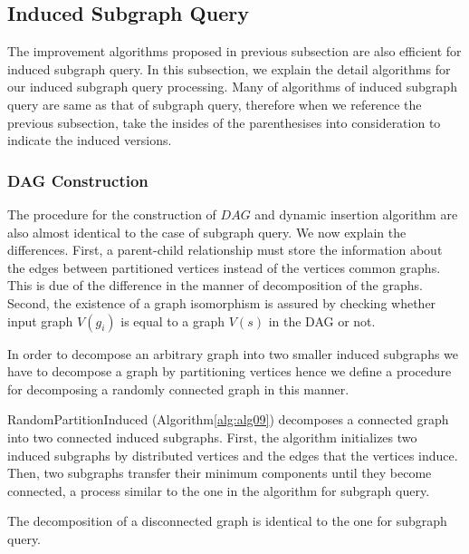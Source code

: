 \subsection{Induced Subgraph Query}
The improvement algorithms proposed in previous subsection are also efficient for induced subgraph query.
In this subsection, we explain the detail algorithms for our induced subgraph query processing.
Many of algorithms of induced subgraph query are same as that of subgraph query, therefore when we reference the 
previous subsection, take the insides of the parenthesises into consideration to indicate the induced versions.

\subsubsection{DAG Construction}
The procedure for the construction of $DAG$ and dynamic insertion algorithm are also almost identical to the case of subgraph query.
We now explain the differences. First, a parent-child relationship must store the information about the edges between partitioned vertices instead of the vertices common graphs. 
This is due of the difference in the manner of decomposition of the graphs. 
Second, the existence of a graph isomorphism is assured by checking whether input graph $V(g_i)$ is equal to a graph $V(s)$ in the DAG or not.

In order to decompose an arbitrary graph into two smaller induced subgraphs we have to decompose a graph by partitioning vertices hence we define a procedure for decomposing a randomly connected graph in this manner.

RandomPartitionInduced (Algorithm\ref{alg:alg09}) decomposes a connected graph into two connected induced subgraphs.
First, the algorithm initializes two induced subgraphs by distributed vertices and the edges that the vertices induce.
Then, two subgraphs transfer their minimum components until they become connected, a process similar to the one in the algorithm for subgraph query.

The decomposition of a disconnected graph is identical to the one for subgraph query.

